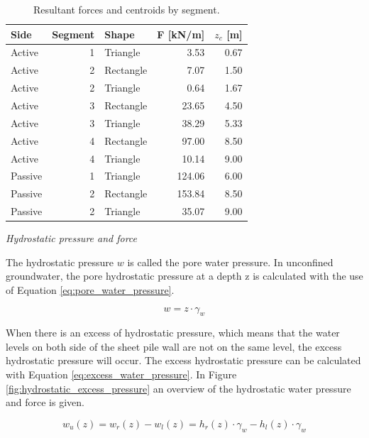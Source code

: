 \begin{table}[H]
  \centering
  \caption{Resultant forces and centroids by segment.}
  \label{tab:forces_centroids}
  \small
  \setlength{\tabcolsep}{8pt}
  \renewcommand{\arraystretch}{1.15}
  \begin{tabular}{@{}l r l r r@{}}
    \toprule
    Side & Segment & Shape &
    F [kN/m] & $z_c$ [m] \\
    \midrule
    Active & 1 & Triangle  &  3.53 & 0.67 \\
    Active & 2 & Rectangle &  7.07 & 1.50 \\
    Active & 2 & Triangle  &  0.64 & 1.67 \\
    Active & 3 & Rectangle & 23.65 & 4.50 \\
    Active & 3 & Triangle  & 38.29 & 5.33 \\
    Active & 4 & Rectangle & 97.00 & 8.50 \\
    Active & 4 & Triangle  & 10.14 & 9.00 \\
    Passive & 1 & Triangle  & 124.06 & 6.00 \\
    Passive & 2 & Rectangle & 153.84 & 8.50 \\
    Passive & 2 & Triangle  &  35.07 & 9.00 \\
    \bottomrule
  \end{tabular}
\end{table}

\textit{Hydrostatic pressure and force}

The hydrostatic pressure $w$ is called the pore water pressure. In unconfined groundwater, the pore hydrostatic pressure at a depth z is calculated with the use of Equation \ref{eq:pore_water_pressure}.

\begin{equation}
    w = z \cdot \gamma_{w}
    \label{eq:pore_water_pressure}
\end{equation}

When there is an excess of hydrostatic pressure, which means that the water levels on both side of the sheet pile wall are not on the same level, the excess hydrostatic pressure will occur. The excess hydrostatic pressure can be calculated with Equation \ref{eq:excess_water_pressure}. In Figure \ref{fig:hydrostatic_excess_pressure} an overview of the hydrostatic water pressure and force is given.

\begin{equation}
    w_{u}(z) = w_{r}(z) - w_{l}(z) = h_{r}(z) \cdot \gamma_{w} - h_{l}(z) \cdot \gamma_{w}
    \label{eq:excess_water_pressure}
\end{equation}

